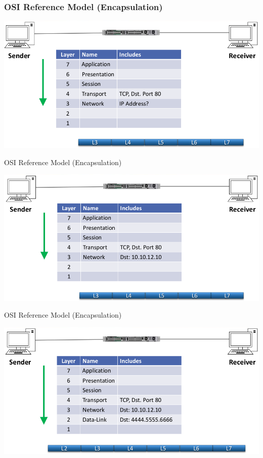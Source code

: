 \documentclass[pdflatex,compress,mathserif]{beamer}
\begin{document}
\begin{frame}
	\frametitle{OSI Reference Model (Encapsulation)}
	\begin{center}
		\includegraphics[width=\linewidth]{img/img40}
	\end{center}
\end{frame}

\begin{frame}{OSI Reference Model (Encapsulation)}
	\begin{center}
		\includegraphics[width=\linewidth]{img/img41}
	\end{center}
\end{frame}

\begin{frame}{OSI Reference Model (Encapsulation)}
	\begin{center}
		\includegraphics[width=\linewidth]{img/img42}
	\end{center}
\end{frame}
\end{document}
